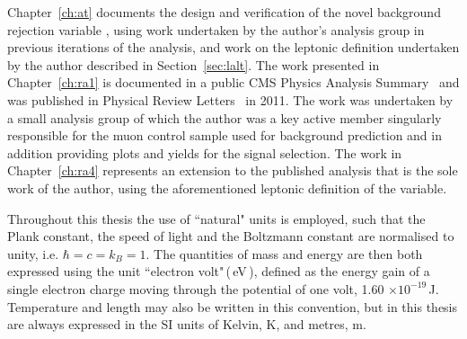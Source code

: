 Chapter~\ref{ch:at} documents the design and verification of the novel background rejection variable \alt, using work undertaken by the author's analysis group in previous iterations of the analysis, and work on the leptonic definition undertaken by the author described in Section~\ref{sec:lalt}. The work presented in Chapter~\ref{ch:ra1} is documented in a public CMS Physics Analysis Summary~\cite{1fbnote} and was published in Physical Review Letters~\cite{PRL1fb} in 2011. The work was undertaken by a small analysis group of which the author was a key active member singularly responsible for the muon control sample used for background prediction and in addition providing plots and yields for the signal selection. The work in Chapter~\ref{ch:ra4} represents an extension to the published analysis that is the sole work of the author, using the aforementioned leptonic definition of the \alt variable. 

Throughout this thesis the use of ``natural" units is employed, such that the Plank constant, the speed of light and the Boltzmann constant are normalised to unity, i.e. $\hbar = c =  k_{B} = 1$. The quantities of mass and energy are then both expressed using the unit ``electron volt"\,(\,eV\,), defined as the energy gain of a single electron charge moving through the potential of one volt, 1.60 $\times 10^{-19}$\,J. Temperature and length may also be written in this convention, but in this thesis are always expressed in the SI units of Kelvin, K, and metres, m. 